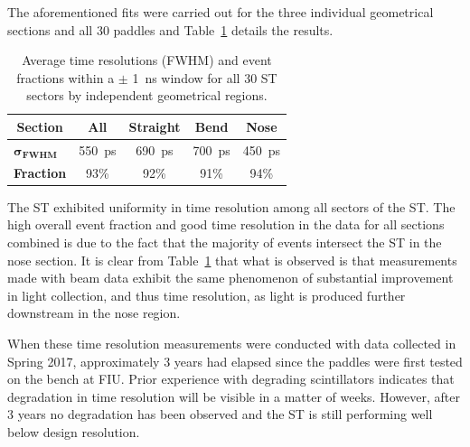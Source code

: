 
The aforementioned fits were carried out for the three individual geometrical sections and all 30 paddles and  Table~\ref{tab:time_res_section} details the results.

	\begin{table}[htbp]
		\centering
		\begin{tabular}{@{} l *4c @{}}
			\toprule
			\multicolumn{1}{c}{\textbf{Section}}    & \textbf{All}  & \textbf{Straight}  & \textbf{Bend}  & \textbf{Nose}  \\ 
			\midrule
			$\mathbf{\sigma_{FWHM}}$ & 550~ps & 690~ps & 700~ps & 450~ps \\ 
			\textbf{Fraction} & 93\% & 92\% & 91\% & 94\% \\\bottomrule
		\end{tabular}
		\caption{Average time resolutions (FWHM) and event fractions within a $\pm$ 1~ns window for all 30 ST sectors by independent geometrical regions.}
		\label{tab:time_res_section}
	\end{table}

The ST exhibited uniformity in time resolution among all sectors of the ST. The high overall event fraction and good time resolution in the data for all sections combined is due to the fact that the majority of events intersect the ST in the nose section. 
It is clear from Table~\ref{tab:time_res_section} that what is observed is that measurements made with beam data exhibit the same phenomenon of substantial improvement in light collection, and thus time resolution, as light is produced further downstream in the nose region.

When these time resolution measurements were conducted with data collected in Spring 2017, approximately 3 years had elapsed since the paddles were first tested on the bench at FIU.  Prior experience with degrading scintillators indicates that degradation in time resolution will be visible in a matter of weeks.  However, after 3 years no degradation has been observed and the ST is still performing well below design resolution.
